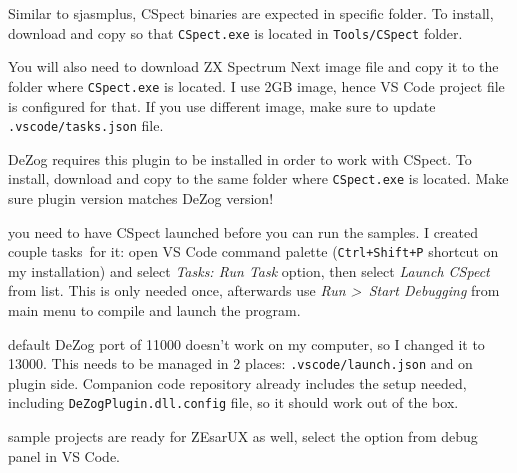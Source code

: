 \documentclass[12pt,twoside,openright,a4paper]{book}
\begin{document}
\begin{description}[style=unboxed,leftmargin=0cm]
	Similar to sjasmplus, CSpect binaries are expected in specific folder. To install, download and copy so that {\tt CSpect.exe} is located in {\tt Tools/CSpect} folder.

	\item[CSpect Next Image (\url{http://www.zxspectrumnext.online/#sd})]\hfill

	You will also need to download ZX Spectrum Next image file and copy it to the folder where {\tt CSpect.exe} is located. I use 2GB image, hence VS Code project file is configured for that. If you use different image, make sure to update {\tt .vscode/tasks.json} file.
	
	\item[DeZog CSpect plugin (\url{https://github.com/maziac/DeZogPlugin})]\hfill

	DeZog requires this plugin to be installed in order to work with CSpect. To install, download and copy to the same folder where {\tt CSpect.exe} is located. Make sure plugin version matches DeZog version!

\end{description}

{
	\footnotesize

	\begin{description}[topsep=1pt,itemsep=1pt,labelindent=0pt,leftmargin=0pt]		
		\item[Note:] you need to have CSpect launched before you can run the samples. I created couple tasks\footnotemark~for it: open VS Code command palette ({\tt Ctrl+Shift+P} shortcut on my installation) and select \textit{Tasks: Run Task} option, then select \textit{Launch CSpect} from list. This is only needed once, afterwards use \textit{Run \textgreater ~Start Debugging} from main menu to compile and launch the program.

		\item[Note:] default DeZog port of 11000 doesn't work on my computer, so I changed it to 13000. This needs to be managed in 2 places: {\tt .vscode/launch.json} and on plugin side. Companion code repository already includes the setup needed, including {\tt DeZogPlugin.dll.config} file, so it should work out of the box.
	
		\item[Note:] sample projects are ready for ZEsarUX as well, select the option from debug panel in VS Code.
	\end{description}
}

\end{document}
